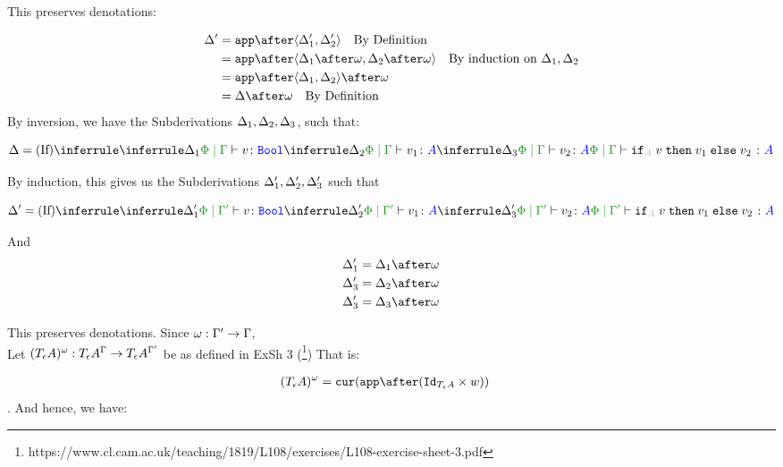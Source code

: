 \documentclass{report}
\begin{document}
        This preserves denotations:

        \begin{align*}
            \D' &= \app\after\pr{\D_1'}{\D_2'} \qt{By Definition}\\
            &= \app\after\pr{\D_1\after\w}{\D_2\after\w} \qt{By induction on $\D_1, \D_2$}\\
            &= \app\after\pr{\D_1}{\D_2}\after\w\\
            &= \D\after\w\qt{By Definition}
        \end{align*}
    By inversion, we have the Subderivations $\Delta_1,\Delta_2,\Delta_3$, such that:


    \begin{equation}
        \D = \ntreeruleIII{If}{
            \treeruleI{\D_1}{\etyperelation{\P}{\G}{v}{\B}}
            }{
            \treeruleI{\D_2}{\etyperelation{\P}{\G}{v_1}{A}}
            }{
            \treeruleI{\D_3}{\etyperelation{\P}{\G}{v_2}{A}}
        }{
            \etyperelation{\P}{\G}{\pifthenelse{A}{v}{v_1}{v_2}}{A}
        }
    \end{equation}

    By induction, this gives us the Subderivations $\Delta_1', \Delta_2', \Delta_3'$ such that

    \begin{equation}
        \D' = \ntreeruleIII{If}{
            \treeruleI{\D_1'}{\etyperelation{\P}{\G'}{v}{\B}}
            }{
            \treeruleI{\D_2'}{\etyperelation{\P}{\G'}{v_1}{A}}
            }{
            \treeruleI{\D_3'}{\etyperelation{\P}{\G'}{v_2}{A}}
        }{
            \etyperelation{\P}{\G'}{\pifthenelse{A}{v}{v_1}{v_2}}{A}
        }
    \end{equation}

    And 
    \begin{align*}
        \D_1' & =\D_1 \after \w\\
        \D_3' & =\D_2 \after \w\\
        \D_3' & =\D_3 \after \w 
    \end{align*}


    This preserves denotations.
    Since $\omega: \Gamma' \rightarrow \Gamma$, \\
    Let $(T_{\epsilon}{A})^{\omega}: T_{\epsilon}{A}^{\Gamma}\rightarrow T_{\epsilon}{A}^{\Gamma'}$ be as defined in ExSh 3 (\footnote{https://www.cl.cam.ac.uk/teaching/1819/L108/exercises/L108-exercise-sheet-3.pdf})
    That is:

    \begin{align*}
        (\tea)^{\w} & = \cur{\app\after(\Id{\tea}\times w)}
    \end{align*}.
    And hence, we have:
\end{document}
